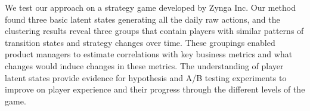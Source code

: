 We test our approach on a strategy game developed by Zynga Inc. %
Our method found three basic latent  states generating all the daily raw actions, and  the clustering results reveal three 
 groups that contain players with similar patterns of transition states and strategy changes over time.  These groupings enabled product managers to estimate correlations with key business metrics and what changes would induce changes in these metrics.  The understanding of player latent states provide evidence for hypothesis and A/B testing experiments to improve on player experience and their progress through the different levels of the game.


